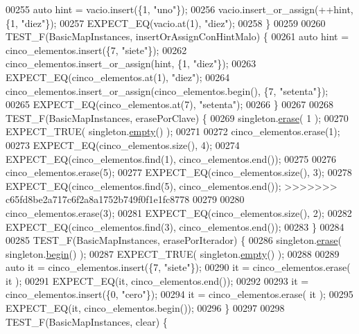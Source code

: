 \begin{DoxyCode}
00255     \textcolor{keyword}{auto} hint = vacio.insert(\{1, \textcolor{stringliteral}{"uno"}\});
00256     vacio.insert\_or\_assign(++hint, \{1, \textcolor{stringliteral}{"diez"}\});
00257     EXPECT\_EQ(vacio.at(1), \textcolor{stringliteral}{"diez"});
00258 \}
00259 
00260 TEST\_F(BasicMapInstances, insertOrAssignConHintMalo) \{
00261     \textcolor{keyword}{auto} hint = cinco\_elementos.insert(\{7, \textcolor{stringliteral}{"siete"}\});
00262     cinco\_elementos.insert\_or\_assign(hint, \{1, \textcolor{stringliteral}{"diez"}\});
00263     EXPECT\_EQ(cinco\_elementos.at(1), \textcolor{stringliteral}{"diez"});
00264     cinco\_elementos.insert\_or\_assign(cinco\_elementos.begin(), \{7, \textcolor{stringliteral}{"setenta"}\});
00265     EXPECT\_EQ(cinco\_elementos.at(7), \textcolor{stringliteral}{"setenta"});
00266 \}
00267 
00268 TEST\_F(BasicMapInstances, erasePorClave) \{
00269     singleton.\hyperlink{classaed2_1_1map_ad8e796bf9c9c558e5ce6b61e116253fe_ad8e796bf9c9c558e5ce6b61e116253fe}{erase}( 1 );
00270     EXPECT\_TRUE( singleton.\hyperlink{classaed2_1_1map_a0dcb39283f4877ae59cb756ed1d0c048_a0dcb39283f4877ae59cb756ed1d0c048}{empty}() );
00271 
00272     cinco\_elementos.erase(1);
00273     EXPECT\_EQ(cinco\_elementos.size(), 4);
00274     EXPECT\_EQ(cinco\_elementos.find(1), cinco\_elementos.end());
00275 
00276     cinco\_elementos.erase(5);
00277     EXPECT\_EQ(cinco\_elementos.size(), 3);
00278     EXPECT\_EQ(cinco\_elementos.find(5), cinco\_elementos.end());
>>>>>>> c65fd8be2a717c6f2a8a1752b749f0f1e1fc8778
00279 
00280     cinco\_elementos.erase(3);
00281     EXPECT\_EQ(cinco\_elementos.size(), 2);
00282     EXPECT\_EQ(cinco\_elementos.find(3), cinco\_elementos.end());
00283 \}
00284 
00285 TEST\_F(BasicMapInstances, erasePorIterador) \{
00286     singleton.\hyperlink{classaed2_1_1map_ad8e796bf9c9c558e5ce6b61e116253fe_ad8e796bf9c9c558e5ce6b61e116253fe}{erase}( singleton.\hyperlink{classaed2_1_1map_a58a95705d54b3dda7f775ce5a22225cb_a58a95705d54b3dda7f775ce5a22225cb}{begin}() );
00287     EXPECT\_TRUE( singleton.\hyperlink{classaed2_1_1map_a0dcb39283f4877ae59cb756ed1d0c048_a0dcb39283f4877ae59cb756ed1d0c048}{empty}() );
00288 
00289     \textcolor{keyword}{auto} it = cinco\_elementos.insert(\{7, \textcolor{stringliteral}{"siete"}\});
00290     it = cinco\_elementos.erase( it );
00291     EXPECT\_EQ(it, cinco\_elementos.end());
00292 
00293     it = cinco\_elementos.insert(\{0, \textcolor{stringliteral}{"cero"}\});
00294     it = cinco\_elementos.erase( it );
00295     EXPECT\_EQ(it, cinco\_elementos.begin());
00296 \}
00297 
00298 TEST\_F(BasicMapInstances, clear) \{

\end{DoxyCode}
